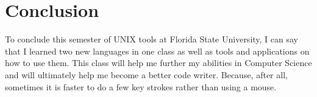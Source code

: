 \documentclass{article}
\begin{document}
\section{Conclusion}
To conclude this semester of UNIX tools at Florida State University, I can say that I learned two new languages in one class as well as tools and applications on how to use them. This class will help me further my abilities in Computer Science and will ultimately help me become a better code writer. Because, after all, sometimes it is faster to do a few key strokes rather than using a mouse.



\end{document}
